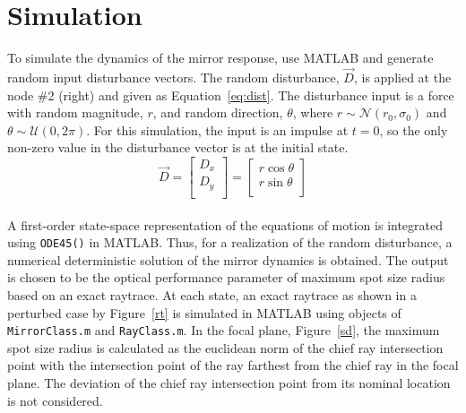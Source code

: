 \section{Simulation}

To simulate the dynamics of the mirror response, use MATLAB and generate random input disturbance vectors. The random disturbance, $\vec{D}$, is applied at the node \#2 (right) and given as Equation~\eqref{eq:dist}. The disturbance input is a force with random magnitude, $r$, and random direction, $\theta$, where $r \sim \mathcal{N}\left(r_0,\sigma_0\right)$ and $\theta \sim \mathcal{U}\left(0,2\pi\right)$. For this simulation, the input is an impulse at $t=0$, so the only non-zero value in the disturbance vector is at the initial state.\\

\begin{equation}
\label{eq:dist}
	\vec{D} = \left[
					\begin{array}{c}
					D_x\\
					D_y\\
					\end{array}
					\right]
				= \left[
					\begin{array}{c}
					r\cos{\theta}\\
					r\sin{\theta}\\
					\end{array}
					\right]
\end{equation}\\

 A first-order state-space representation of the equations of motion is integrated using \texttt{ODE45()} in MATLAB. Thus, for a realization of the random disturbance, a numerical deterministic solution of the mirror dynamics is obtained. The output is chosen to be the optical performance parameter of maximum spot size radius based on an exact raytrace. At each state, an exact raytrace as shown in a perturbed case by Figure~\ref{rt} is simulated in MATLAB using objects of \texttt{MirrorClass.m} and \texttt{RayClass.m}. In the focal plane, Figure~\ref{sd}, the maximum spot size radius is calculated as the euclidean norm of the chief ray intersection point with the intersection point of the ray farthest from the chief ray in the focal plane. The deviation of the chief ray intersection point from its nominal location is not considered. \\
 
